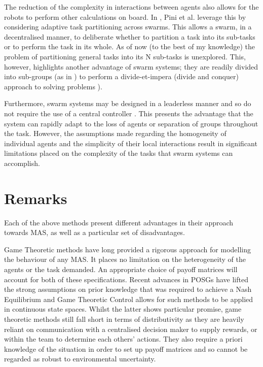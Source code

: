 \documentclass[.../main.tex]{subfiles}
\begin{document}

The reduction of the complexity in interactions between agents also allows for the robots to perform
other calculations on board. In \cite{Pini2011TaskSelection}, Pini et al. leverage this by
considering adaptive task partitioning across swarms. This allows a swarm, in a decentralised
manner, to deliberate whether to partition a task into its sub-tasks or to perform the task in its
whole. As of now (to the best of my knowledge) the problem of partitioning general tasks into its N
sub-tasks is unexplored. This, however, highlights another advantage of swarm systems; they are
readily divided into sub-groups (as in \cite{Zahadat2016DivisionInhibition}) to perform a
divide-et-impera (divide and conquer) approach to solving problems \cite{Pini2011TaskSelection}). 

Furthermore, swarm systems may be designed in a leaderless manner and so do not require the use of a
central controller \cite{Couceiro2015}. This presents the advantage that the system can rapidly
adapt to the loss of agents or separation of groups throughout the task. However, the assumptions
made regarding the homogeneity of individual agents and the simplicity of their local interactions
result in significant limitations placed on the complexity of the tasks that swarm systems can
accomplish.


\section{Remarks} \label{sec:remarks}

Each of the above methods present different advantages in their approach towards MAS, as well as a
particular set of disadvantages. 

Game Theoretic methods have long provided a rigorous approach for
modelling the behaviour of any MAS. It places no limitation on the heterogeneity of the agents or
the task demanded. An appropriate choice of payoff matrices will account for both of these
specifications. Recent advances in POSGs have lifted the strong assumptions on prior knowledge that
was required to achieve a Nash Equilibrium and Game Theoretic Control allows for such methods to be
applied in continuous state spaces. Whilst the latter shows particular promise, game theoretic
methods still fall short in terms of distributivity as they are heavily reliant on communication
with a centralised decision maker to supply rewards, or within the team to determine each others'
actions. They also require a priori knowledge of the situation in order to set up payoff matrices
and so cannot be regarded as robust to environmental uncertainty.
\end{document}
